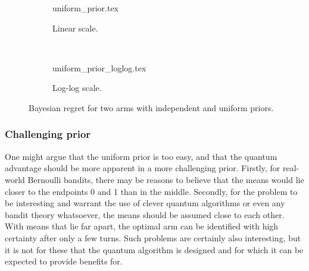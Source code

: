 \begin{figure}
    \centering
    \begin{subfigure}{\textwidth}
        \centering
        \newcommand{\myoptions}{
            width=10cm,
            height=8cm,
            xlabel={Kiloturn},
            ylabel={Regret},
            legend entries={UCB, QUCB, Thompson},
            legend pos=north west,
            legend cell align=left,
            mystyle,
            ymax = 150,
        }
        {uniform_prior.tex}
        \caption{Linear scale.}
    \end{subfigure}
    \\[3ex]
    \begin{subfigure}{\textwidth}
        \centering
        \newcommand{\myoptions}{
            width=10cm,
            height=8cm,
            xlabel={Turn},
            ylabel={Regret},
            legend entries={UCB, QUCB, Thompson},
            legend pos=north west,
            legend cell align=left,
            mystyle,
        }
        {uniform_prior_loglog.tex}
        \caption{Log-log scale.}
    \end{subfigure}
    \caption[
        Bayesian regret for two Bernoulli arms, uniform prior.
    ]
    {
        Bayesian regret for two arms with independent and uniform priors.
    }
    \label{fig:random}
\end{figure}


\subsubsection{Challenging prior}
One might argue that the uniform prior is too easy, and that the quantum advantage should be more apparent in a more challenging prior.
Firstly, for real-world Bernoulli bandits, there may be reasons to believe that the means would lie closer to the endpoints 0 and 1 than in the middle.
Secondly, for the problem to be interesting and warrant the use of clever quantum algorithms or even any bandit theory whatsoever, the means should be assumed close to each other.
With means that lie far apart, the optimal arm can be identified with high certainty after only a few turns.
Such problems are certainly also interesting, but it is not for these that the quantum algorithm is designed and for which it can be expected to provide benefits for.

